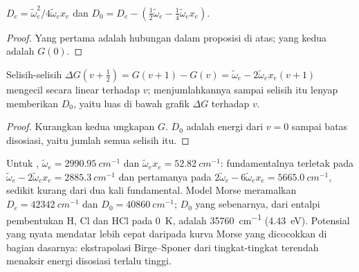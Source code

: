 \begin{corollary}\label{cor:b3:rovibrational-spectroscopy:de}
$D_e = \tilde\omega_e^2/4\tilde\omega_ex_e$ dan $D_0 = D_e - (\frac12\tilde\omega_e -
\frac14\tilde\omega_ex_e)$.
\end{corollary}

\begin{proof}
Yang pertama adalah hubungan dalam proposisi di atas; yang kedua adalah $G(0)$.
\end{proof}

\begin{proposition}\label{prop:b3:rovibrational-spectroscopy:birge-sponer}
Selisih-selisih $\Delta G(v + \frac12) = G(v+1) - G(v) = \tilde\omega_e - 2\tilde\omega_ex_e(v +
1)$ mengecil secara linear terhadap $v$; menjumlahkannya sampai selisih itu
lenyap memberikan $D_0$, yaitu luas di bawah grafik $\Delta G$ terhadap $v$.
\end{proposition}

\begin{proof}
Kurangkan kedua ungkapan $G$. $D_0$ adalah energi dari $v = 0$ sampai batas
disosiasi, yaitu jumlah semua selisih itu.
\end{proof}

\begin{example}\label{ex:b3:rovibrational-spectroscopy:hcl}
Untuk , $\tilde\omega_e = \qty{2990.95}{cm^{-1}}$ dan
$\tilde\omega_ex_e =
\qty{52.82}{cm^{-1}}$: fundamentalnya terletak pada
$\tilde\omega_e - 2\tilde\omega_ex_e =
\qty{2885.3}{cm^{-1}}$ dan  pertamanya
pada $2\tilde\omega_e - 6\tilde\omega_ex_e =
\qty{5665.0}{cm^{-1}}$, sedikit kurang dari
dua kali fundamental. Model Morse meramalkan $D_e = \qty{42342}{cm^{-1}}$ dan
$D_0 = \qty{40860}{cm^{-1}}$; $D_0$ yang sebenarnya, dari entalpi pembentukan H,
Cl dan HCl pada \qty{0}{K}, adalah \qty{35760}{cm^{-1}} (\qty{4.43}{eV}).
Potensial yang nyata mendatar lebih cepat daripada kurva Morse yang
dicocokkan di bagian dasarnya: ekstrapolasi Birge--Sponer dari tingkat-tingkat
terendah menaksir energi disosiasi terlalu tinggi.
\end{example}

